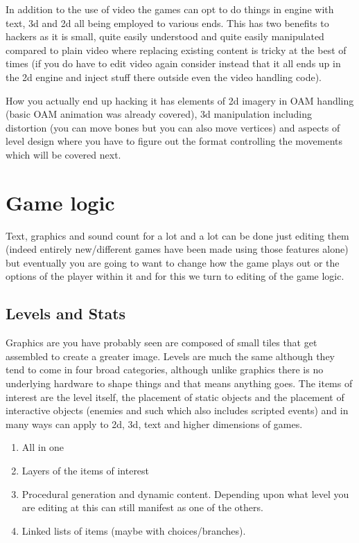 \documentclass[
]{book}
\providecommand{\tightlist}{%
  \setlength{\itemsep}{0pt}\setlength{\parskip}{0pt}}
\begin{document}
In addition to the use of video the games can opt to do things in engine with text, 3d and 2d all being employed to various ends. This has two benefits to hackers as it is small, quite easily understood and quite easily manipulated compared to plain video where replacing existing content is tricky at the best of times (if you do have to edit video again consider instead that it all ends up in the 2d engine and inject stuff there outside even the video handling code).

How you actually end up hacking it has elements of 2d imagery in OAM handling (basic OAM animation was already covered), 3d manipulation including distortion (you can move bones but you can also move vertices) and aspects of level design where you have to figure out the format controlling the movements which will be covered next.

\hypertarget{game-logic}{%
\chapter{Game logic}\label{game-logic}}

Text, graphics and sound count for a lot and a lot can be done just editing them (indeed entirely new/different games have been made using those features alone) but eventually you are going to want to change how the game plays out or the options of the player within it and for this we turn to editing of the game logic.

\hypertarget{levels-and-stats}{%
\section{Levels and Stats}\label{levels-and-stats}}

Graphics are you have probably seen are composed of small tiles that get assembled to create a greater image. Levels are much the same although they tend to come in four broad categories, although unlike graphics there is no underlying hardware to shape things and that means anything goes. The items of interest are the level itself, the placement of static objects and the placement of interactive objects (enemies and such which also includes scripted events) and in many ways can apply to 2d, 3d, text and higher dimensions of games.

\begin{enumerate}
\def\labelenumi{\arabic{enumi}.}
\tightlist
\item
  All in one
\item
  Layers of the items of interest
\item
  Procedural generation and dynamic content. Depending upon what level you are editing at this can still manifest as one of the others.
\item
  Linked lists of items (maybe with choices/branches).
\end{enumerate}
\end{document}

